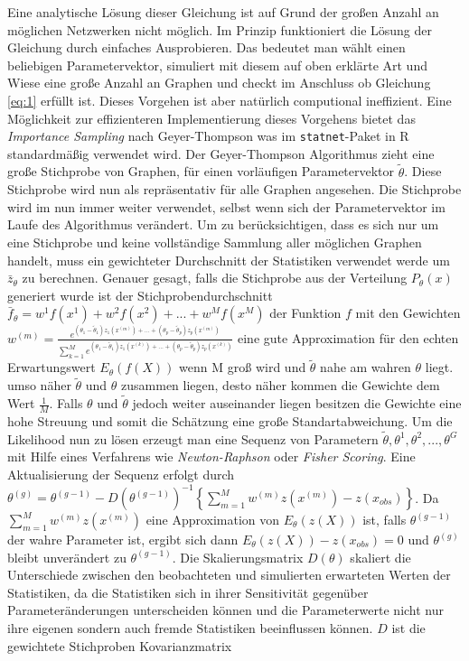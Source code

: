 \documentclass[a4paper,ngerman,oneside,titlepage,bibliography=totoc,11pt]{scrreprt}
\begin{document}
Eine analytische Lösung dieser Gleichung ist auf Grund der großen Anzahl an möglichen Netzwerken nicht möglich. Im Prinzip funktioniert die Lösung der Gleichung durch einfaches Ausprobieren. Das bedeutet man wählt einen beliebigen Parametervektor, simuliert mit diesem auf oben erklärte Art und Wiese eine große Anzahl an Graphen und checkt im Anschluss ob Gleichung \ref{eq:1} erfüllt ist. Dieses Vorgehen ist aber natürlich computional ineffizient. Eine Möglichkeit zur effizienteren Implementierung dieses Vorgehens bietet das \emph{Importance Sampling} nach Geyer-Thompson was im \texttt{statnet}-Paket \citep{pack:statnet} in R  \citep{R} standardmäßig verwendet wird. Der Geyer-Thompson Algorithmus zieht eine große Stichprobe von Graphen, für einen vorläufigen Parametervektor $\widetilde{\theta}$. Diese Stichprobe wird nun als repräsentativ für alle Graphen angesehen. Die Stichprobe wird im nun immer weiter verwendet, selbst wenn sich der Parametervektor im Laufe des Algorithmus verändert. Um zu berücksichtigen, dass es sich nur um eine Stichprobe und keine vollständige Sammlung aller möglichen Graphen handelt, muss ein gewichteter Durchschnitt der Statistiken verwendet werde um $\bar{z}_\theta$ zu berechnen. Genauer gesagt, falls die Stichprobe aus der Verteilung $P_\theta(x)$ generiert wurde ist der Stichprobendurchschnitt $\bar{f}_\theta = w^1 f(x^1) + w^2 f(x^2) + ... + w^M f(x^M)$ der Funktion $f$ mit den Gewichten $w^{(m)} = \frac{e^{(\theta_1-\widetilde{\theta}_1)z_1(x^{(m)})+...+(\theta_p-\widetilde{\theta}_p)z_p(x^{(m)})}}{\sum_{k=1}^{M}{e^{(\theta_1-\widetilde{\theta}_1)z_1(x^{(k)})+...+(\theta_p-\widetilde{\theta}_p)z_p(x^{(k)})}}}$ 
eine gute Approximation für den echten Erwartungswert $E_\theta(f(X))$ wenn M groß wird und $\widetilde{\theta}$ nahe am wahren $\theta$ liegt. umso näher $\widetilde{\theta}$ und $\theta$ zusammen liegen, desto näher kommen die Gewichte dem Wert $\frac{1}{M}$. Falls $\theta$ und $\widetilde{\theta}$ jedoch weiter auseinander liegen besitzen die Gewichte eine hohe Streuung und somit die Schätzung eine große Standartabweichung.
Um die Likelihood nun zu lösen erzeugt man eine Sequenz von Parametern $\widetilde{\theta},\theta^{1}, \theta^{2},...,\theta^{G}$ mit Hilfe eines Verfahrens wie \emph{Newton-Raphson} oder \emph{Fisher Scoring}. Eine Aktualisierung der Sequenz erfolgt durch $\theta^{(g)} = \theta^{(g-1)} - {D(\theta^{(g-1)})}^{-1}\left\{\sum^{M}_{m = 1}{w^{(m)}z(x^{(m)})} - z(x_{obs})\right\}$. Da $\sum^{M}_{m = 1}{w^{(m)}z(x^{(m)})}$ eine Approximation von $E_\theta(z(X))$ ist, falls $\theta^{(g-1)}$ der wahre Parameter ist, ergibt sich dann $E_\theta(z(X)) - z(x_{obs}) = 0$ und $\theta^{(g)}$ bleibt unverändert zu $\theta^{(g-1)}$. Die Skalierungsmatrix $D(\theta)$ skaliert die Unterschiede zwischen den beobachteten und simulierten erwarteten Werten der Statistiken, da die Statistiken sich in ihrer Sensitivität gegenüber Parameteränderungen unterscheiden können und die Parameterwerte nicht nur ihre eigenen sondern auch fremde Statistiken beeinflussen können. $D$ ist die gewichtete Stichproben Kovarianzmatrix 
\end{document}
